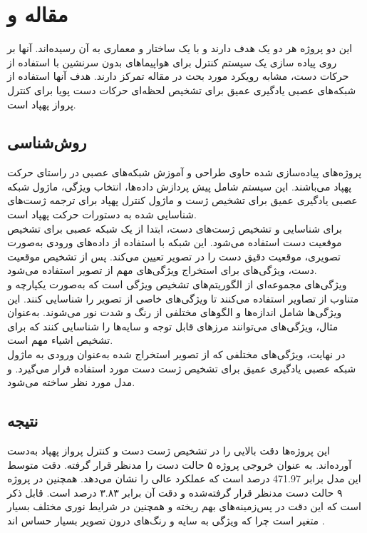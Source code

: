 \section{مقاله  و }
این دو پروژه هر دو یک هدف دارند و با یک ساختار و معماری به آن رسیده‌اند. آنها بر روی پیاده سازی یک سیستم کنترل برای هواپیماهای بدون سرنشین با استفاده از حرکات دست، مشابه رویکرد مورد بحث در مقاله تمرکز دارند. هدف آنها استفاده از شبکه‌های عصبی یادگیری عمیق برای تشخیص لحظه‌ای حرکات دست پویا برای کنترل پرواز پهپاد است.
\subsection{روش‌شناسی}
پروژه‌های پیاده‌سازی شده حاوی طراحی و آموزش شبکه‌های عصبی در راستای حرکت پهپاد می‌باشند. این سیستم شامل پیش پردازش داده‌ها، انتخاب ویژگی، ماژول شبکه عصبی یادگیری عمیق برای تشخیص ژست و ماژول کنترل پهپاد برای ترجمه ژست‌های شناسایی شده به دستورات حرکت پهپاد است.
\\
برای شناسایی و تشخیص ژست‌های دست، ابتدا از یک شبکه عصبی برای تشخیص موقعیت دست استفاده می‌شود. این شبکه با استفاده از داده‌های ورودی به‌صورت تصویری، موقعیت دقیق دست را در تصویر تعیین می‌کند. پس از تشخیص موقعیت دست، ویژگی‌های  برای استخراج ویژگی‌های مهم از تصویر استفاده می‌شود.
\\
ویژگی‌های  مجموعه‌ای از الگوریتم‌های تشخیص ویژگی است که به‌صورت یکپارچه و متناوب از تصاویر استفاده می‌کنند تا ویژگی‌های خاصی از تصویر را شناسایی کنند. این ویژگی‌ها شامل اندازه‌ها و الگوهای مختلفی از رنگ و شدت نور می‌شوند. به‌عنوان مثال، ویژگی‌های  می‌توانند مرزهای قابل توجه و سایه‌ها را شناسایی کنند که برای تشخیص اشیاء مهم است.
\\
در نهایت، ویژگی‌های مختلفی که از تصویر استخراج شده به‌عنوان ورودی به ماژول شبکه عصبی یادگیری عمیق برای تشخیص ژست دست مورد استفاده قرار می‌گیرد. و مدل مورد نظر ساخته می‌شود.

\subsection{نتیجه}
این پروژه‌ها دقت بالایی را در تشخیص ژست دست و کنترل پرواز پهپاد به‌دست آورده‌اند. به عنوان خروجی پروژه  ۵ حالت دست را مدنظر قرار گرفته‌. 
 دقت متوسط این مدل برابر 471.97 درصد است که عملکرد عالی را نشان می‌دهد. همچنین در پروژه  ۹ حالت دست مدنظر قرار گرفته‌شده و دقت آن برابر ۳.۸۳ درصد است.
 قابل ذکر است که این دقت در پس‌زمینه‌های بهم ریخته و همچنین در شرایط نوری مختلف بسیار متغیر است چرا که ویژگی  به سایه و رنگ‌های درون تصویر بسیار حساس اند \cite{natarajan2018hand} \cite{hadri2018hand}.



